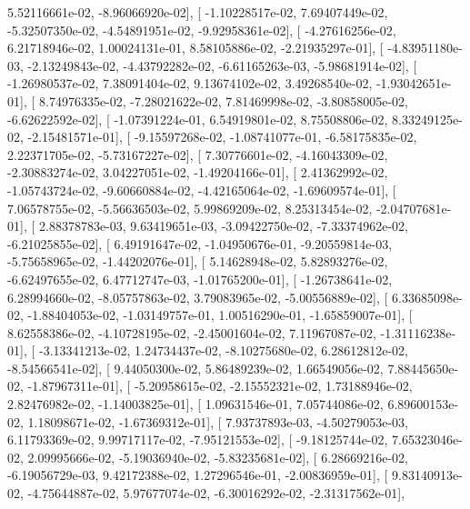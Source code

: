 \documentclass{article}
\begin{document}
          5.52116661e-02,  -8.96066920e-02],
       [ -1.10228517e-02,   7.69407449e-02,  -5.32507350e-02,
         -4.54891951e-02,  -9.92958361e-02],
       [ -4.27616256e-02,   6.21718946e-02,   1.00024131e-01,
          8.58105886e-02,  -2.21935297e-01],
       [ -4.83951180e-03,  -2.13249843e-02,  -4.43792282e-02,
         -6.61165263e-03,  -5.98681914e-02],
       [ -1.26980537e-02,   7.38091404e-02,   9.13674102e-02,
          3.49268540e-02,  -1.93042651e-01],
       [  8.74976335e-02,  -7.28021622e-02,   7.81469998e-02,
         -3.80858005e-02,  -6.62622592e-02],
       [ -1.07391224e-01,   6.54919801e-02,   8.75508806e-02,
          8.33249125e-02,  -2.15481571e-01],
       [ -9.15597268e-02,  -1.08741077e-01,  -6.58175835e-02,
          2.22371705e-02,  -5.73167227e-02],
       [  7.30776601e-02,  -4.16043309e-02,  -2.30883274e-02,
          3.04227051e-02,  -1.49204166e-01],
       [  2.41362992e-02,  -1.05743724e-02,  -9.60660884e-02,
         -4.42165064e-02,  -1.69609574e-01],
       [  7.06578755e-02,  -5.56636503e-02,   5.99869209e-02,
          8.25313454e-02,  -2.04707681e-01],
       [  2.88378783e-03,   9.63419651e-03,  -3.09422750e-02,
         -7.33374962e-02,  -6.21025855e-02],
       [  6.49191647e-02,  -1.04950676e-01,  -9.20559814e-03,
         -5.75658965e-02,  -1.44202076e-01],
       [  5.14628948e-02,   5.82893276e-02,  -6.62497655e-02,
          6.47712747e-03,  -1.01765200e-01],
       [ -1.26738641e-02,   6.28994660e-02,  -8.05757863e-02,
          3.79083965e-02,  -5.00556889e-02],
       [  6.33685098e-02,  -1.88404053e-02,  -1.03149757e-01,
          1.00516290e-01,  -1.65859007e-01],
       [  8.62558386e-02,  -4.10728195e-02,  -2.45001604e-02,
          7.11967087e-02,  -1.31116238e-01],
       [ -3.13341213e-02,   1.24734437e-02,  -8.10275680e-02,
          6.28612812e-02,  -8.54566541e-02],
       [  9.44050300e-02,   5.86489239e-02,   1.66549056e-02,
          7.88445650e-02,  -1.87967311e-01],
       [ -5.20958615e-02,  -2.15552321e-02,   1.73188946e-02,
          2.82476982e-02,  -1.14003825e-01],
       [  1.09631546e-01,   7.05744086e-02,   6.89600153e-02,
          1.18098671e-02,  -1.67369312e-01],
       [  7.93737893e-03,  -4.50279053e-03,   6.11793369e-02,
          9.99717117e-02,  -7.95121553e-02],
       [ -9.18125744e-02,   7.65323046e-02,   2.09995666e-02,
         -5.19036940e-02,  -5.83235681e-02],
       [  6.28669216e-02,  -6.19056729e-03,   9.42172388e-02,
          1.27296546e-01,  -2.00836959e-01],
       [  9.83140913e-02,  -4.75644887e-02,   5.97677074e-02,
         -6.30016292e-02,  -2.31317562e-01],
\end{document}
